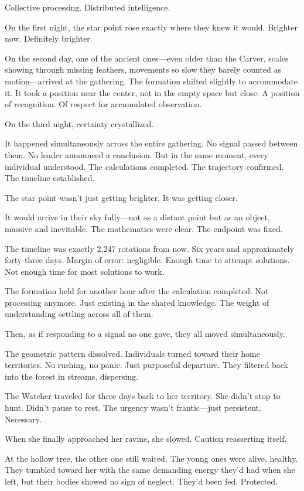 Collective processing. Distributed intelligence.

On the first night, the star point rose exactly where they knew it would. Brighter now. Definitely brighter.

On the second day, one of the ancient ones—even older than the Carver, scales showing through missing feathers, movements so slow they barely counted as motion—arrived at the gathering. The formation shifted slightly to accommodate it. It took a position near the center, not in the empty space but close. A position of recognition. Of respect for accumulated observation.

On the third night, certainty crystallized.

It happened simultaneously across the entire gathering. No signal passed between them. No leader announced a conclusion. But in the same moment, every individual understood. The calculations completed. The trajectory confirmed. The timeline established.

The star point wasn't just getting brighter. It was getting closer.

It would arrive in their sky fully—not as a distant point but as an object, massive and inevitable. The mathematics were clear. The endpoint was fixed.

The timeline was exactly 2,247 rotations from now. Six years and approximately forty-three days. Margin of error: negligible. Enough time to attempt solutions. Not enough time for most solutions to work.

The formation held for another hour after the calculation completed. Not processing anymore. Just existing in the shared knowledge. The weight of understanding settling across all of them.

Then, as if responding to a signal no one gave, they all moved simultaneously.

The geometric pattern dissolved. Individuals turned toward their home territories. No rushing, no panic. Just purposeful departure. They filtered back into the forest in streams, dispersing.

The Watcher traveled for three days back to her territory. She didn't stop to hunt. Didn't pause to rest. The urgency wasn't frantic—just persistent. Necessary.

When she finally approached her ravine, she slowed. Caution reasserting itself.

At the hollow tree, the other one still waited. The young ones were alive, healthy. They tumbled toward her with the same demanding energy they'd had when she left, but their bodies showed no sign of neglect. They'd been fed. Protected.

